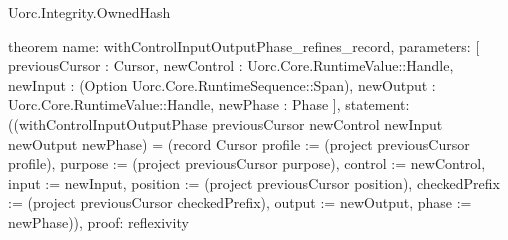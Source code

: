 \begin{lexlean}{Uorc.Integrity.OwnedHash}
\begin{semanticmodule}
theorem{
  name: withControlInputOutputPhase_refines_record,
  parameters: [
    previousCursor : Cursor,
    newControl : Uorc.Core.RuntimeValue::Handle,
    newInput : (Option Uorc.Core.RuntimeSequence::Span),
    newOutput : Uorc.Core.RuntimeValue::Handle,
    newPhase : Phase
  ],
  statement: ((withControlInputOutputPhase previousCursor newControl newInput newOutput newPhase) = (record Cursor {profile := (project previousCursor profile), purpose := (project previousCursor purpose), control := newControl, input := newInput, position := (project previousCursor position), checkedPrefix := (project previousCursor checkedPrefix), output := newOutput, phase := newPhase})),
  proof: reflexivity{}
}
\end{semanticmodule}
\end{lexlean}
